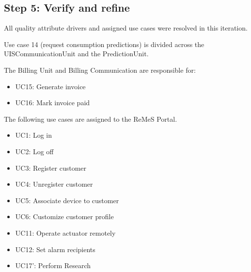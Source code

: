 \subsection{Step 5: Verify and refine}
\label{add:it10/verification}

\npar All quality attribute drivers and assigned use cases were resolved in
this iteration. 

\npar Use case 14 (request consumption predictions) is divided across the
UISCommunicationUnit and the PredictionUnit.

\npar The Billing Unit and Billing Communication are responsible for:

\begin{itemize}
    \item UC15: Generate invoice
    \item UC16: Mark invoice paid
\end{itemize}

\npar The following use cases are assigned to the ReMeS Portal.

\begin{itemize}
	\item UC1: Log in
	\item UC2: Log off
	\item UC3: Register customer
	\item UC4: Unregister customer
	\item UC5: Associate device to customer
	\item UC6: Customize customer profile
	\item UC11: Operate actuator remotely
	\item UC12: Set alarm recipients
	\item UC17': Perform Research
\end{itemize}